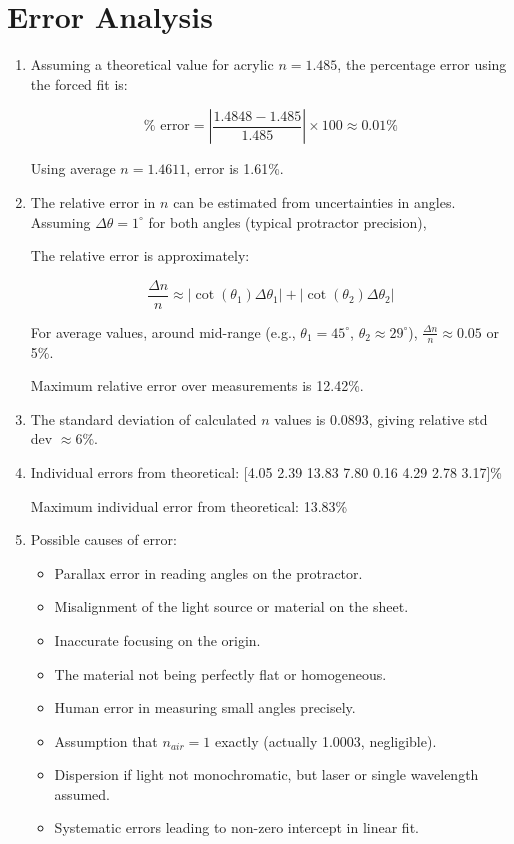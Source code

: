 \documentclass[12pt, a4paper]{article}
\begin{document}
\section{Error Analysis}
\begin{enumerate}
\item Assuming a theoretical value for acrylic $n = 1.485$, the percentage error using the forced fit is:

\[ \% \text{ error} = \left| \frac{1.4848 - 1.485}{1.485} \right| \times 100 \approx 0.01\% \]

Using average $n=1.4611$, error is 1.61\%.

\item The relative error in $n$ can be estimated from uncertainties in angles. Assuming $\Delta \theta = 1^\circ$ for both angles (typical protractor precision),

The relative error is approximately:

\[ \frac{\Delta n}{n} \approx \left| \cot(\theta_1) \Delta \theta_1 \right| + \left| \cot(\theta_2) \Delta \theta_2 \right| \]

For average values, around mid-range (e.g., $\theta_1 = 45^\circ$, $\theta_2 \approx 29^\circ$), $\frac{\Delta n}{n} \approx 0.05$ or 5\%.

Maximum relative error over measurements is 12.42\%.

\item The standard deviation of calculated $n$ values is 0.0893, giving relative std dev $\approx 6\%$.

\item Individual errors from theoretical: [4.05  2.39 13.83  7.80  0.16  4.29  2.78  3.17]\%

Maximum individual error from theoretical: 13.83\%

\item Possible causes of error:
\begin{itemize}
\item Parallax error in reading angles on the protractor.
\item Misalignment of the light source or material on the sheet.
\item Inaccurate focusing on the origin.
\item The material not being perfectly flat or homogeneous.
\item Human error in measuring small angles precisely.
\item Assumption that $n_{air} = 1$ exactly (actually 1.0003, negligible).
\item Dispersion if light not monochromatic, but laser or single wavelength assumed.
\item Systematic errors leading to non-zero intercept in linear fit.
\end{itemize}
\end{enumerate}
\end{document}
